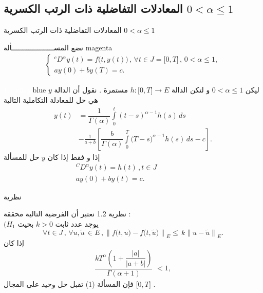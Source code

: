 \documentclass[dvipsnames,mathserif]{beamer}
\begin{document}
\subsection{ المعادلات التفاضلية ذات الرتب الكسرية $0<\alpha \le 1$ }
\begin{frame}{ المعادلات التفاضلية ذات الرتب الكسرية $0<\alpha \le 1$ }
\vspace{-1.3cm}
\begin{ambox}{نضع المســــــــــــــــــــألة }{magenta}
\begin{align}
\begin{cases}
 {}^{c}D{}^{\alpha }y(t)=f\big(t,y(t)\big)\,,\,\forall t\in J=\big[0,T\big]\,,\,0<\alpha \le 1 , \\
 ay(0)+by(T)=c. 
\end{cases}
\end{align}
\end{ambox}
\end{frame}
\begin{frame}
\vspace{-1cm}
\begin{box2}{\textcolor{white}{توطئة 1.2}}{blue}
{\LARGE{}}
ليكن
$0<\alpha\le 1$
و لتكن الدالة 
$h:\big[0,T\big]\to E$
مستمرة .
 نقول أن الدالة $y$ هي حل للمعادلة التكاملية التالية 
\begin{align*}
 \nonumber y(t)&=\dfrac{1}{\Gamma (\alpha )}\int\limits_{0}^{t}{{{(t-s)}^{\alpha -1}}}h(s)\,ds\\
\nonumber &-\frac{1}{a+b}\left[ \dfrac{b}{\Gamma (\alpha )}\int\limits_{0}^{T}{(T-s}{{)}^{\alpha -1}}h(s)\,ds-c \right]. 
 \end{align*}
إذا و فقط إذا كان $y$ حل للمسألة 
\begin{align*}
 & {}^{C}{{D}^{\alpha }}y(t)=h(t)\,,t\in J \\ 
&ay(0)+by(t)=c.\hspace{3cm}
\end{align*}
\end{box2}
\end{frame}
\begin{frame}{نظرية}
\begin{mybox}[colbacktitle = green]{نظرية 1.2}
{\LARGE{}}
نعتبر أن الفرضية التالية محققة :
\\
$\big(H_{1}$
يوجد عدد ثابت $k>0$
بحيث
$$\forall t\in J\,,\,\forall u,\tilde{u} \,\in E\,,{{\big\| f\big(t,u\big)-f\big(t,\tilde{u} \big) \big\|}_{E}}\le \,k{{\big\| u-\tilde{u}\big\|}_{E}}.$$
إذا كان 
\begin{align*} 
\dfrac{k{{T}^{\alpha }}\left( 1+\dfrac{\left| a \right|}{\left| a+b \right|} \right)}{\Gamma (\alpha +1)}\,\,<1,
\end{align*} 
فإن المسألة (1)
تقبل حل وحيد على المجال
$\big[0,T\big]$
.
\end{mybox}
\end{frame}
\end{document}
